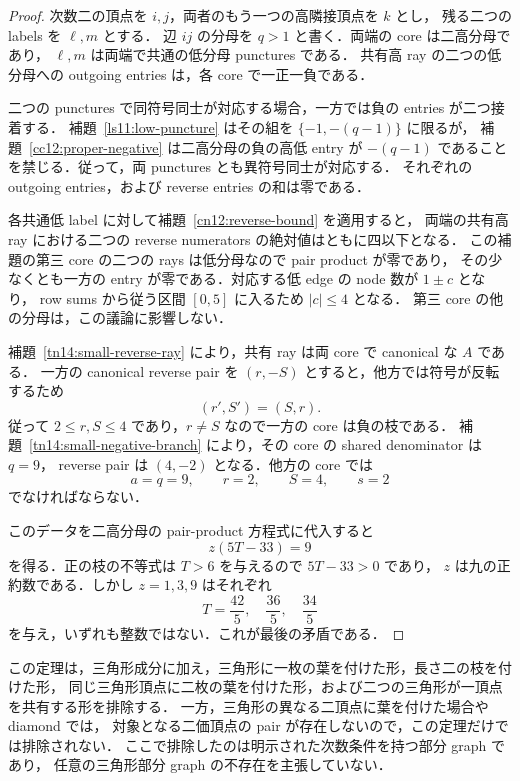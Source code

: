 \begin{proof}
次数二の頂点を $i,j$，両者のもう一つの高隣接頂点を $k$ とし，
残る二つの labels を $\ell,m$ とする．
辺 $ij$ の分母を $q>1$ と書く．両端の core は二高分母であり，
$\ell,m$ は両端で共通の低分母 punctures である．
共有高 ray の二つの低分母への outgoing entries は，各 core で一正一負である．

二つの punctures で同符号同士が対応する場合，一方では負の entries が二つ接着する．
補題~\ref{ls11:low-puncture} はその組を $\{-1,-(q-1)\}$ に限るが，
補題~\ref{cc12:proper-negative} は二高分母の負の高低 entry が
$-(q-1)$ であることを禁じる．従って，両 punctures とも異符号同士が対応する．
それぞれの outgoing entries，および reverse entries の和は零である．

各共通低 label に対して補題~\ref{cn12:reverse-bound} を適用すると，
両端の共有高 ray における二つの reverse numerators の絶対値はともに四以下となる．
この補題の第三 core の二つの rays は低分母なので pair product が零であり，
その少なくとも一方の entry が零である．対応する低 edge の node 数が $1\pm c$ となり，
row sums から従う区間 $[0,5]$ に入るため $|c|\leq4$ となる．
第三 core の他の分母は，この議論に影響しない．

補題~\ref{tn14:small-reverse-ray} により，共有 ray は両 core で canonical な $A$ である．
一方の canonical reverse pair を $(r,-S)$ とすると，他方では符号が反転するため
\[
 (r',S')=(S,r).
\]
従って $2\leq r,S\leq4$ であり，$r\ne S$ なので一方の core は負の枝である．
補題~\ref{tn14:small-negative-branch} により，その core の shared denominator は $q=9$，
reverse pair は $(4,-2)$ となる．他方の core では
\[
 a=q=9,\qquad r=2,\qquad S=4,\qquad s=2
\]
でなければならない．

このデータを二高分母の pair-product 方程式に代入すると
\begin{equation}\label{tn14:terminal-divisor}
 z(5T-33)=9
\end{equation}
を得る．正の枝の不等式は $T>6$ を与えるので $5T-33>0$ であり，
$z$ は九の正約数である．しかし $z=1,3,9$ はそれぞれ
\[
 T=\frac{42}{5},\quad \frac{36}{5},\quad \frac{34}{5}
\]
を与え，いずれも整数ではない．これが最後の矛盾である．
\end{proof}

この定理は，三角形成分に加え，三角形に一枚の葉を付けた形，長さ二の枝を付けた形，
同じ三角形頂点に二枚の葉を付けた形，および二つの三角形が一頂点を共有する形を排除する．
一方，三角形の異なる二頂点に葉を付けた場合や diamond では，
対象となる二価頂点の pair が存在しないので，この定理だけでは排除されない．
ここで排除したのは明示された次数条件を持つ部分 graph であり，
任意の三角形部分 graph の不存在を主張していない．
